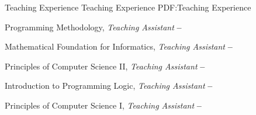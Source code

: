 \Section
{Teaching Experience}
{Teaching Experience}
{PDF:Teaching Experience}

\Entry
\UMassTitle

\SubEntry
\Gap
Programming Methodology, \textit{Teaching Assistant}
\dotfill
\textbf{ -- }

\SubEntry
\Gap
Mathematical Foundation for Informatics, \textit{Teaching Assistant}
\dotfill
\textbf{ -- }

\BigGap
\Entry
\TrinityTitle

\SubEntry
\Gap
Principles of Computer Science II, \textit{Teaching Assistant}
\dotfill
\textbf{ -- }

\SubEntry
\Gap
Introduction to Programming Logic, \textit{Teaching Assistant}
\dotfill
\textbf{ -- }

\SubEntry
\Gap
Principles of Computer Science I, \textit{Teaching Assistant}
\dotfill
\textbf{ -- }
